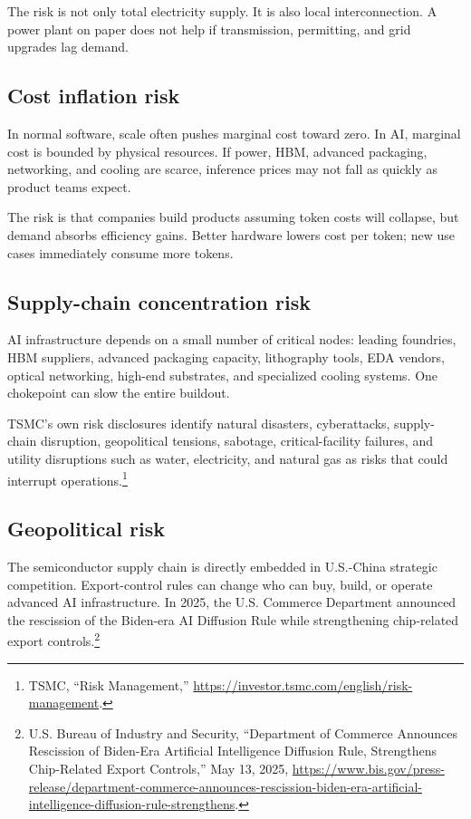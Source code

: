 The risk is not only total electricity supply. It is also local interconnection. A power plant on paper does not help if transmission, permitting, and grid upgrades lag demand.

\subsection{Cost inflation risk}

In normal software, scale often pushes marginal cost toward zero. In AI, marginal cost is bounded by physical resources. If power, HBM, advanced packaging, networking, and cooling are scarce, inference prices may not fall as quickly as product teams expect.

The risk is that companies build products assuming token costs will collapse, but demand absorbs efficiency gains. Better hardware lowers cost per token; new use cases immediately consume more tokens.

\subsection{Supply-chain concentration risk}

AI infrastructure depends on a small number of critical nodes: leading foundries, HBM suppliers, advanced packaging capacity, lithography tools, EDA vendors, optical networking, high-end substrates, and specialized cooling systems. One chokepoint can slow the entire buildout.

TSMC's own risk disclosures identify natural disasters, cyberattacks, supply-chain disruption, geopolitical tensions, sabotage, critical-facility failures, and utility disruptions such as water, electricity, and natural gas as risks that could interrupt operations.\footnote{TSMC, ``Risk Management,'' \url{https://investor.tsmc.com/english/risk-management}.}

\subsection{Geopolitical risk}

The semiconductor supply chain is directly embedded in U.S.-China strategic competition. Export-control rules can change who can buy, build, or operate advanced AI infrastructure. In 2025, the U.S. Commerce Department announced the rescission of the Biden-era AI Diffusion Rule while strengthening chip-related export controls.\footnote{U.S. Bureau of Industry and Security, ``Department of Commerce Announces Rescission of Biden-Era Artificial Intelligence Diffusion Rule, Strengthens Chip-Related Export Controls,'' May 13, 2025, \url{https://www.bis.gov/press-release/department-commerce-announces-rescission-biden-era-artificial-intelligence-diffusion-rule-strengthens}.}

